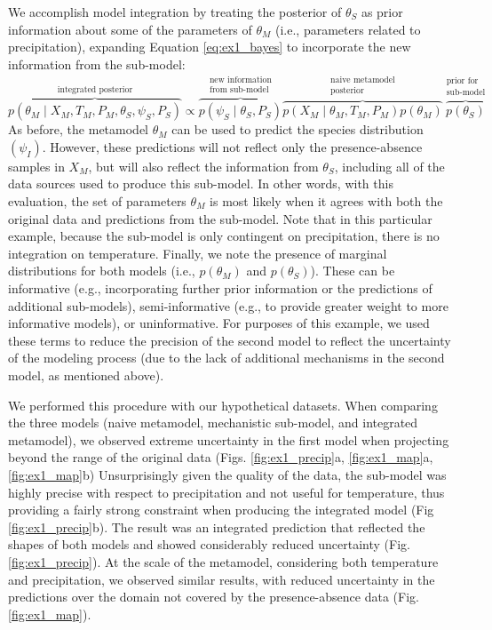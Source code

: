 \documentclass[11pt]{article}
\begin{document}
We accomplish model integration by treating the posterior of \(\theta_S\) as prior information about some of the parameters of \(\theta_M\) (i.e., parameters related to precipitation), expanding Equation \ref{eq:ex1_bayes} to incorporate the new information from the sub-model:
\begin{equation}
	\label{eq:ex1_integrated}
	\overbrace{p(\theta_M \mid X_M, T_M, P_M, \theta_S, \psi_S, P_S)}^\text{integrated posterior}
	\propto
	\overbrace{p\left (\psi_S \mid \theta_S,P_S \right )}^{\substack{\text{new information} \\ \text{from sub-model}}}
	\overbrace{p \left(X_M \mid \theta_M, T_M, P_M \right) p \left(\theta_M \right)}^{\substack{\text{naive metamodel} \\ \text{posterior}}}
	\overbrace{p \left(\theta_S \right)}^{\substack{\text{prior for} \\ \text{sub-model}}}	
\end{equation}
As before, the metamodel \(\theta_M\) can be used to predict the species distribution \((\psi_I)\).
However, these predictions will not reflect only the presence-absence samples in \(X_M\), but will also reflect the information from \(\theta_S\), including all of the data sources used to produce this sub-model.
In other words, with this evaluation, the set of parameters $\theta_M$ is most likely when it agrees with both the original data and predictions from the sub-model. 
Note that in this particular example, because the sub-model is only contingent on precipitation, there is no integration on temperature. 
Finally, we note the presence of marginal distributions for both models (i.e., \(p(\theta_M)\) and \(p(\theta_S)\)).
These can be informative (e.g., incorporating further prior information or the predictions of additional sub-models), semi-informative (e.g., to provide greater weight to more informative models), or uninformative.
For purposes of this example, we used these terms to reduce the precision of the second model to reflect the uncertainty of the modeling process (due to the lack of additional mechanisms in the second model, as mentioned above).

We performed this procedure with our hypothetical datasets.
When comparing the three models (naive metamodel, mechanistic sub-model, and integrated metamodel), we observed extreme uncertainty in the first model when projecting beyond the range of the original data (Figs. \ref{fig:ex1_precip}a, \ref{fig:ex1_map}a, \ref{fig:ex1_map}b)
Unsurprisingly given the quality of the data, the sub-model was highly precise with respect to precipitation and not useful for temperature, thus providing a fairly strong constraint when producing the integrated model (Fig \ref{fig:ex1_precip}b).
The result was an integrated prediction that reflected the shapes of both models and showed considerably reduced uncertainty (Fig. \ref{fig:ex1_precip}).
At the scale of the metamodel, considering both temperature and precipitation, we observed similar results, with reduced uncertainty in the predictions over the domain not covered by the presence-absence data (Fig. \ref{fig:ex1_map}).
\end{document}
